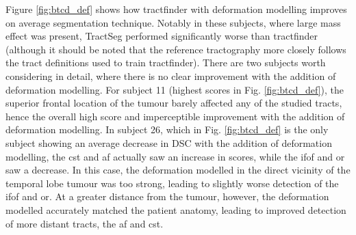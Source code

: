 Figure \ref{fig:btcd_def} shows how tractfinder with deformation modelling improves on average segmentation technique.
Notably in these subjects, where large mass effect was present, TractSeg performed significantly worse than tractfinder (although it should be noted that the reference tractography more closely follows the tract definitions used to train tractfinder).
There are two subjects worth considering in detail, where there is no clear improvement with the addition of deformation modelling.
For subject 11 (highest scores in Fig. \ref{fig:btcd_def}), the superior frontal location of the tumour barely affected any of the studied tracts, hence the overall high score and imperceptible improvement with the addition of deformation modelling.
In subject 26, which in Fig. \ref{fig:btcd_def} is the only subject showing an average decrease in DSC with the addition of deformation modelling, the \gls{cst} and \gls{af} actually saw an increase in scores, while the \gls{ifof} and \gls{or} saw a decrease.
In this case, the deformation modelled in the direct vicinity of the temporal lobe tumour was too strong, leading to slightly worse detection of the \gls{ifof} and \gls{or}.
At a greater distance from the tumour, however, the deformation modelled accurately matched the patient anatomy, leading to improved detection of more distant tracts, the \gls{af} and \gls{cst}.

